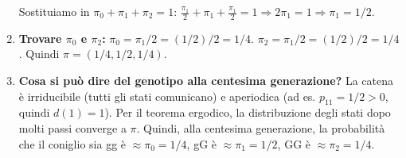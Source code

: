 \begin{example}
\begin{enumerate}
    Sostituiamo in $\pi_0 + \pi_1 + \pi_2 = 1$:
    $\frac{\pi_1}{2} + \pi_1 + \frac{\pi_1}{2} = 1 \Rightarrow 2\pi_1 = 1 \Rightarrow \pi_1 = 1/2$.
    \item \textbf{Trovare $\pi_0$ e $\pi_2$:}
    $\pi_0 = \pi_1/2 = (1/2)/2 = 1/4$.
    $\pi_2 = \pi_1/2 = (1/2)/2 = 1/4$.
    Quindi $\pi = (1/4, 1/2, 1/4)$.
    \item \textbf{Cosa si può dire del genotipo alla centesima generazione?}
    La catena è irriducibile (tutti gli stati comunicano) e aperiodica (ad es. $p_{11}=1/2 > 0$, quindi $d(1)=1$). Per il teorema ergodico, la distribuzione degli stati dopo molti passi converge a $\pi$. Quindi, alla centesima generazione, la probabilità che il coniglio sia gg è $\approx \pi_0=1/4$, gG è $\approx \pi_1=1/2$, GG è $\approx \pi_2=1/4$.
\end{enumerate}
\end{example}

